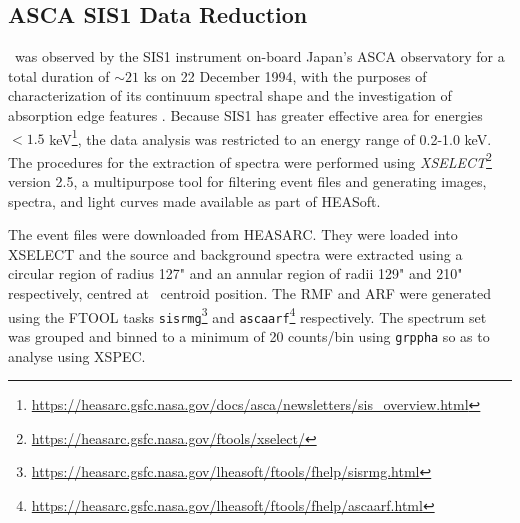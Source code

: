     	
    	\subsection{ASCA SIS1 Data Reduction} \label{multi-obs:red-analysis:sis1}
    		\source\ was observed by the SIS1 instrument on-board Japan's ASCA observatory for a total duration of $\sim 21$ ks on 22 December 1994, with the purposes of characterization of its continuum spectral shape and the investigation of absorption edge features \cite{ebisawaAsca2001ApJ}. Because SIS1 has greater effective area for energies $<1.5$ keV\footnote{\url{https://heasarc.gsfc.nasa.gov/docs/asca/newsletters/sis_overview.html}}, the data analysis was restricted to an energy range of 0.2-1.0 keV. The procedures for the extraction of spectra were performed using \textit{XSELECT}\footnote{\url{https://heasarc.gsfc.nasa.gov/ftools/xselect/}} version 2.5, a multipurpose tool for filtering event files and generating images, spectra, and light curves made available as part of HEASoft.
    	
    		The event files were downloaded from HEASARC. They were loaded into XSELECT and the source and background spectra were extracted using a circular region of radius 127" and an annular region of radii 129" and 210" respectively, centred at \source\ centroid position. The RMF and ARF were generated using the FTOOL tasks \texttt{sisrmg}\footnote{\url{https://heasarc.gsfc.nasa.gov/lheasoft/ftools/fhelp/sisrmg.html}} and \texttt{ascaarf}\footnote{\url{https://heasarc.gsfc.nasa.gov/lheasoft/ftools/fhelp/ascaarf.html}} respectively. The spectrum set was grouped and binned to a minimum of 20 counts/bin using \texttt{grppha} so as to analyse using XSPEC.
    	
